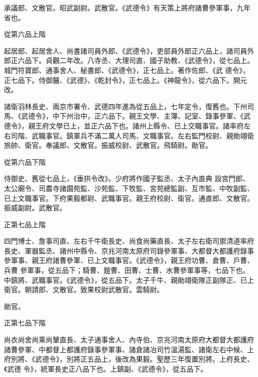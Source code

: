 \begin{pinyinscope}
 承議郎、文散官。昭武副尉。武散官。《武德令》有天策上將府諸曹參軍事，九年省也。



 從第六品上階



 起居郎、起居舍人、尚書諸司員外郎、《武德令》，吏部員外郎正六品上，諸司員外郎正六品下。貞觀二年改。八寺丞、大理司直、國子助教、《武德令》，從七品上。城門符寶郎、通事舍人、秘書郎、《武德令》，正七品上。著作佐郎、《武
 德令》，正七品下。侍御醫、《武德》、《乾封令》，正七品上。《神龍令》，從六品下。開元改。



 諸衛羽林長史、兩京市署令、武德四年進為從五品上，七年定令，復舊也。下州司馬、《武德令》，中下州治中，正六品下。親王文學、主簿、記室、錄事參軍、《武德令》，親王府文學已上，並正六品下也。諸州上縣令、已上交職事官。諸率府左右司階、武職事官。鎮軍兵不滿二萬人司馬、文職事官。左右監門校尉、親勛翊衛旅帥、衛官。奉議郎、文散官。振威校尉、武散官。飛騎尉。勛官。



 從第六品下階



 侍御史、舊從七品上，《垂拱令改》。少府將作國子監丞、太子內直典
 設宮門郎、太公廟令、司農寺諸園苑監、沙苑監、下牧監、宮苑總監副、互市監、中牧副監、已上文職事官。下府果毅都尉、武職事官。親王府校尉、衛官。通直郎、文散官。振威副尉。武散官。



 正第七品上階



 四門博士、詹事司直、左右千牛衛長史、尚食尚藥直長、太子左右衛司禦清道率府長史、軍器監丞、諸州中縣令、京兆河南太原府司錄參軍事、大都督大都護府錄事參軍事、親王府諸曹參軍、已上文職事官。《武德令》，親王府功曹、倉曹、戶曹、兵曹
 參軍事，從五品下；騎曹、鎧曹、田曹、士曹、水曹參軍事等，七品下也。中鎮將、武職事官。《武德令》，從五品下。太子千牛、親勛翊衛隊正副隊正、已上衛官。朝請郎、文散官。致果校尉武散官。雲騎尉。



 勛官。



 正第七品下階



 尚衣尚舍尚乘尚輦直長、太子通事舍人、內寺伯、京兆河南太原府大都督大都護府諸曹參軍、中都督上都護府錄事參軍事、諸倉諸冶司竹溫湯監、諸衛左右中候、上府別將、《武德令》，別將正五品上，後改為果毅。聖歷三年復置別將。上府長史、《武德
 令》，統軍長史正八品下也。上鎮副、《武德令》，從五品下。




\end{pinyinscope}
